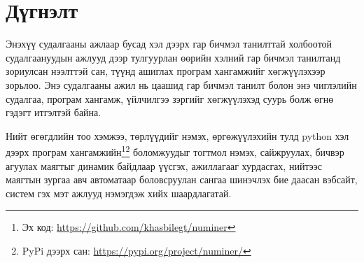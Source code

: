 \chapter{Дүгнэлт}

Энэхүү судалгааны ажлаар бусад хэл дээрх гар бичмэл танилттай холбоотой судалгаануудын ажлууд дээр тулгуурлан өөрийн хэлний гар бичмэл танилтанд зориулсан нээлттэй сан, түүнд ашиглах програм хангамжийг хөгжүүлэхээр зорьлоо. Энэ судалгааны ажил нь цаашид гар бичмэл танилт болон энэ чиглэлийн судалгаа, програм хангамж, үйлчилгээ зэргийг хөгжүүлэхэд суурь болж өгнө гэдэгт итгэлтэй байна.


Нийт өгөгдлийн тоо хэмжээ, төрлүүдийг нэмэх, өргөжүүлэхийн тулд python хэл дээрх програм хангамжийн\footnote{Эх код: \url{https://github.com/khasbilegt/numiner}}\footnote{PyPi дээрх сан: \url{https://pypi.org/project/numiner/}} боломжуудыг тогтмол нэмэх, сайжруулах, бичвэр агуулах маягтыг динамик байдлаар үүсгэх, ажиллагааг хурдасгах, нийтээс маягтын зургаа авч автоматаар боловсруулан сангаа шинэчлэх бие даасан вэбсайт, систем гэх мэт ажлууд нэмэгдэж хийх шаардлагатай.